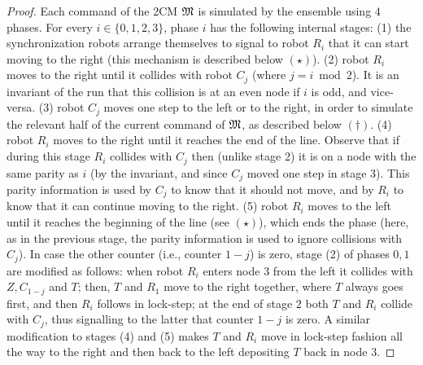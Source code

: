 \documentclass{llncs}
\newcommand{\sr}[1]{\footnote{{\color{red} Note. #1}}}
\renewcommand{\sr}[1]{}
\newcommand{\round}{\ensuremath{R}}
\newcommand{\zero}{\ensuremath{Z}}
\newcommand{\zeroTest}{\ensuremath{T}}
\newcommand{\counter}{\ensuremath{C}}
\begin{document}
\begin{proof}
Each command of the 2CM $\mathfrak{M}$ is simulated by the ensemble using $4$ phases. For every $i \in \{0,1,2,3\}$, phase $i$ has the following internal stages: (1) the synchronization robots arrange themselves to signal to robot $\round_i$ that it can start moving to the right (this mechanism is described below $(\star)$). (2) robot $\round_i$ moves to the right until it collides with robot $\counter_j$ (where $j = i \bmod 2$). It is an invariant of the run that this collision is at an even node if $i$ is odd, and vice-versa. (3) robot $\counter_j$ moves one step to the left or to the right, in order to simulate the relevant half of the current command of $\mathfrak{M}$, as described below $(\dagger)$. (4) robot $\round_i$ moves to the right until it reaches the end of the line. Observe that if during this stage $\round_i$ collides with $\counter_j$ then (unlike stage 2) it is on a node with the same parity as $i$ (by the invariant, and since $\counter_j$ moved one step in stage 3). This parity information is used by $\counter_j$ to know that it should not move, and by $\round_i$ to know that it can continue moving to the right. (5) robot $\round_i$ moves to the left until it reaches the beginning of the line (see $(\star)$), which ends the phase (here, as in the previous stage, the parity information is used to ignore collisions with $\counter_j$). In case the other counter (i.e., counter $1-j$) is zero, stage (2) of phases $0,1$ are modified as follows: when robot $\round_i$ enters node $3$ from the left it collides with $\zero, \counter_{1-j}$ and $\zeroTest$; then, $\zeroTest$ and $\round_1$ move to the right together, where $\zeroTest$ always goes first, and then $\round_i$ follows in lock-step; at the end of stage $2$ both $\zeroTest$ and $\round_i$ collide with $\counter_j$, thus signalling to the latter that counter $1-j$ is zero. A similar modification to stages (4) and (5) makes $\zeroTest$ and $\round_i$ move in lock-step fashion all the way to the right and then back to the left depositing $\zeroTest$ back in node $3$.
%



\end{proof}
\end{document}
